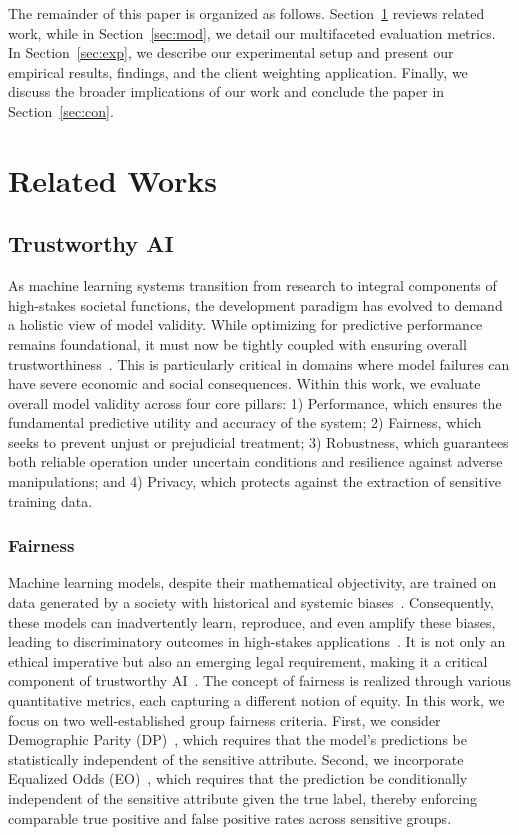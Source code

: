 \documentclass[acmsmall]{acmart}
\begin{document}
The remainder of this paper is organized as follows. Section~\ref{sec:RW} reviews related work, while in Section~\ref{sec:mod}, we detail our multifaceted evaluation metrics. In Section~\ref{sec:exp}, we describe our experimental setup and present our empirical results, findings, and the client weighting application. Finally, we discuss the broader implications of our work and conclude the paper in Section~\ref{sec:con}.

\section{Related Works}
\label{sec:RW}

\subsection{Trustworthy AI}

As machine learning systems transition from research to integral components of high-stakes societal functions, the development paradigm has evolved to demand a holistic view of model validity. While optimizing for predictive performance remains foundational, it must now be tightly coupled with ensuring overall trustworthiness~\cite{huang2024flsurvey}. This is particularly critical in domains where model failures can have severe economic and social consequences. Within this work, we evaluate overall model validity across four core pillars: 1) Performance, which ensures the fundamental predictive utility and accuracy of the system; 2) Fairness, which seeks to prevent unjust or prejudicial treatment; 3) Robustness, which guarantees both reliable operation under uncertain conditions and resilience against adverse manipulations; and 4) Privacy, which protects against the extraction of sensitive training data.

\subsubsection*{Fairness}

Machine learning models, despite their mathematical objectivity, are trained on data generated by a society with historical and systemic biases~\cite{mehrabi2021survey}. Consequently, these models can inadvertently learn, reproduce, and even amplify these biases, leading to discriminatory outcomes in high-stakes applications~\cite{hall2022systematic}. It is not only an ethical imperative but also an emerging legal requirement, making it a critical component of trustworthy AI~\cite{wachter2020bias}. The concept of fairness is realized through various quantitative metrics, each capturing a different notion of equity. In this work, we focus on two well-established group fairness criteria. First, we consider Demographic Parity (DP)~\cite{calders2009building}, which requires that the model’s predictions be statistically independent of the sensitive attribute. Second, we incorporate Equalized Odds (EO)~\cite{hardt2016equality}, which requires that the prediction be conditionally independent of the sensitive attribute given the true label, thereby enforcing comparable true positive and false positive rates across sensitive groups. 
\end{document}

